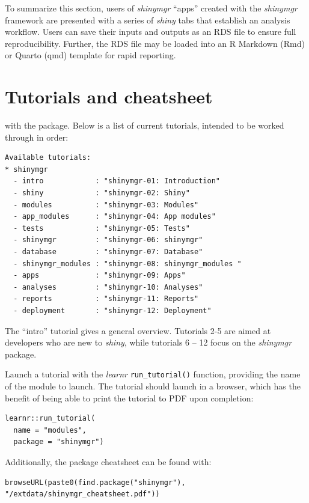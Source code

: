 To summarize this section, users of \emph{shinymgr} ``apps'' created with the \emph{shinymgr} framework are presented with a series of \emph{shiny} tabs that establish an analysis workflow. Users can save their inputs and outputs as an RDS file to ensure full reproducibility. Further, the RDS file may be loaded into an R Markdown (Rmd) or Quarto (qmd) template for rapid reporting.

\section{Tutorials and cheatsheet}\label{tuts}

with the package. Below is a list of current tutorials, intended to be worked through in order:

\begin{verbatim}
Available tutorials:
* shinymgr
  - intro            : "shinymgr-01: Introduction"
  - shiny            : "shinymgr-02: Shiny"
  - modules          : "shinymgr-03: Modules"
  - app_modules      : "shinymgr-04: App modules"
  - tests            : "shinymgr-05: Tests"
  - shinymgr         : "shinymgr-06: shinymgr"
  - database         : "shinymgr-07: Database"
  - shinymgr_modules : "shinymgr-08: shinymgr_modules "
  - apps             : "shinymgr-09: Apps"
  - analyses         : "shinymgr-10: Analyses"
  - reports          : "shinymgr-11: Reports"
  - deployment       : "shinymgr-12: Deployment" 
\end{verbatim}

The ``intro'' tutorial gives a general overview. Tutorials 2-5 are aimed at developers who are new to \emph{shiny}, while tutorials 6 -- 12 focus on the \emph{shinymgr} package.

Launch a tutorial with the \emph{learnr} \texttt{run\_tutorial()} function, providing the name of the module to launch. The tutorial should launch in a browser, which has the benefit of being able to print the tutorial to PDF upon completion:

\begin{verbatim}
learnr::run_tutorial(
  name = "modules", 
  package = "shinymgr")
\end{verbatim}

Additionally, the package cheatsheet can be found with:

\begin{verbatim}
browseURL(paste0(find.package("shinymgr"), "/extdata/shinymgr_cheatsheet.pdf"))
\end{verbatim}

